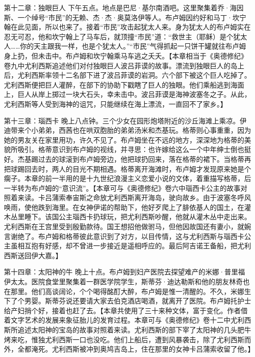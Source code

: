 \par 第十二章：独眼巨人 下午五点。地点是巴尼·基尔南酒吧。这里聚集着乔·海因斯、一个绰号“市民”的无赖、杰·杰·奥莫洛伊等人。布卢姆因约好和马丁·坎宁翰在此见面，所以也来了。接着“市民”攻击起犹太人来。身为犹太人的布卢姆实在忍无可忍，他和坎宁翰上了马车后，就顶撞“市民”道：“救世主（耶稣）是个犹太人……你的天主跟我一样，也是个犹太人。”“市民”气得抓起一只饼干罐就往布卢姆身上扔，但未击中。布卢姆和坎宁翰乘马车逃之夭夭。【本章相当于《奥德修纪》卷九中尤利西斯追述他们对付独眼巨人波吕菲谟的故事。漂流到独眼巨人的岛上后，尤利西斯率领十二名部下进了波吕菲谟的岩洞。六个部下被这个巨人吃掉了。尤利西斯便把巨人灌醉，在部下的协助下戳瞎了巨人的独眼。他们乘船逃到海面上，巨人从岸上掷过一块大石头，幸未击中。波吕菲谟是海神波塞冬之子。从此，尤利西斯等人受到海神的诅咒，只能继续在海上漂流，一直回不了家乡。】
\par 第十三章：瑙西卡 晚上八点钟。三个少女在园形炮塔附近的沙丘海滩上乘凉。伊迪带来个小弟弟，西茜也在哄双胞胎的弟弟汤米和杰基玩。格蒂则心事重重，因为她的男友关在家里用功，许久不见了。布卢姆坐在不远的地方，深深地为格蒂的美貌所吸引。格蒂意识到布卢姆的视线，并寻思：也许嫁给这么一个中年绅士倒也挺好。杰基踢过去的球滚到布卢姆旁边，他把球扔回来，落在格蒂的裙下。当格蒂再把球踢回去时，两人的目光不期相遇。格蒂离开海滩时，布卢姆才发现原来她是个瘸子。本章的前一半用的是十九世纪浪漫主义恋爱小说的文体，着重描写格蒂，后一半转为布卢姆的“意识流”。【本章可与《奥德修纪》卷六中瑙西卡公主的故事对照着来读。卡吕蒲索奉宙斯之命放尤利西斯离开海岛，驶向故乡。由于波塞冬呼风唤雨，使他跌到海里。在女神伊诺的帮助下，他好歹爬上了腓依基人的国土，在灌木丛里睡下。该国公主瑙西卡扔球玩，把尤利西斯吵醒，他就从灌木丛中走出来。尤利西斯在王宫里受到殷勤款待。国王想招他做驸马，但他因故国还有妻小，就婉言谢绝了。布卢姆和格蒂彼此意识到了对方，以目传情，这与尤利西斯与瑙西卡公主虽相互抱有好感，却不曾进一步接近是遥相呼应的。最后阿吉诺王备船，把尤利西斯送回伊大嘉。】
\par 第十四章：太阳神的牛 晚上十点。布卢姆到妇产医院去探望难产的米娜·普里福伊太太。医院食堂里聚集着一群医学院学生，斯蒂芬·迪达勒斯和他的朋友林奇也在那里。他们高谈阔论，个个喝得酩酊大醉，布卢姆是惟一清醒的。不久，米娜生下了个男婴。斯蒂芬说还要请大家去伯克酒店喝酒，就离开了医院。布卢姆托护士给产妇捎个好，接着也赶了去。【本章共使用了三十来种文体，富于变化。作者借着文字艺术的发展来象征胎儿的发育过程。本章可与《奥德修纪》卷十二中尤利西斯所追述太阳神的宝岛的故事对照着来读。尤利西斯的部下宰了太阳神的几头肥牛烤来吃，惟独尤利西斯一口也没吃。他们上船后，遭到风暴袭击，除了尤利西斯而外，全都淹死。尤利西斯被冲到奥鸠吉岛上，住在那里的女神卡吕蒲索收留了他。】
